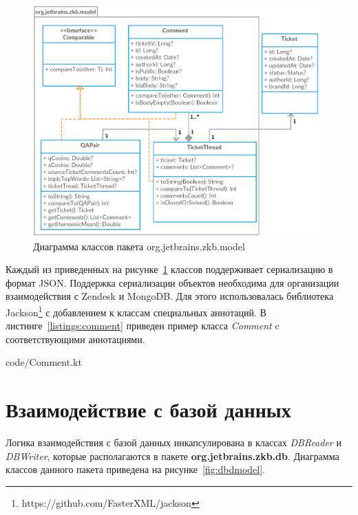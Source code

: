 \begin{figure}[tph!]
\centerline{\includegraphics[width=11cm]{fig/model.png}}
    \caption{Диаграмма классов пакета org.jetbrains.zkb.model}
    \label{fig:umodel}
\end{figure}

Каждый из приведенных на рисунке~\ref{fig:umodel} классов поддерживает сериализацию в формат JSON. Поддержка сериализации объектов необходима для организации взаимодействия с Zendesk и MongoDB. Для этого использовалась библиотека Jackson\footnote{https://github.com/FasterXML/jackson} с добавлением к классам специальных аннотаций. В листинге~\ref{listings:comment} приведен пример класса \textit{Comment} c соответствующими аннотациями.


{code/Comment.kt}

\section{Взаимодействие с базой данных}

Логика взаимодействия с базой данных инкапсулирована в классах \textit{DBReader} и \textit{DBWriter}, которые располагаются в пакете \textbf{org.jetbrains.zkb.db}. Диаграмма классов данного пакета приведена на рисунке~\ref{fig:dbdmodel}.

